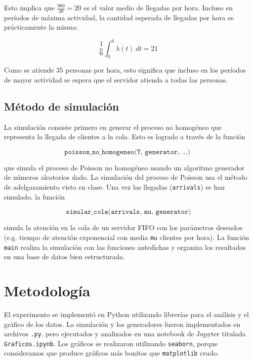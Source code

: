\documentclass[a4paper, 12pt]{article}
\begin{document}
Esto implica que $\frac{960}{48} = 20$ es el valor medio de llegadas por hora.
Incluso en períodos de máxima actividad, la cantidad esperada de llegadas por
hora es prácticamente la misma:

\begin{equation}
    \frac{1}{6}\int_0^{6}\lambda(t) ~ dt = 21
\end{equation}

Como se atiende $35$ personas por hora, esto significa que incluso en los
períodos de mayor actividad se espera que el servidor atienda a todas las
personas.

\subsection{Método de simulación}

La simulación consiste primero en generar el proceso no homogéneo que representa
la llegada de clientes a la cola. Esto es logrado a través de la función 

\begin{equation*}
    \texttt{poisson\_no\_homogeneo(T, generator, ...) }
\end{equation*}

que simula el proceso de Poisson no homogéneo usando un algoritmo generador de
números aleatorios dado. La simulación del proceso de Poisson usa el método de
adelgazamiento visto en clase. Una vez las llegadas (\texttt{arrivals}) se han simulado, la función

\begin{equation*}
\texttt{simular\_cola(arrivals, mu, generator)}
\end{equation*}

simula la atención en la cola de un servidor FIFO con los parámetros deseados
(e.g. tiempo de atención exponencial con media \texttt{mu} clientes por hora). La función \texttt{main}
realiza la simulación con las funciones antedichas y organiza los resultados en
una base de datos bien estructurada.


\section{Metodología}

El experimento se implementó en Python utilizando librerías para el análisis y
el gráfico de los datos. La simulación y los generadores fueron implementados en
archivos \texttt{.py}, pero ejecutados y analizados en una notebook de Jupyter
titulada \texttt{Graficos.ipynb}. Los gráficos se realizaron utilizando
\texttt{seaborn}, porque consideramos que produce gráficos más bonitos que
\texttt{matplotlib} crudo. 
\end{document}
